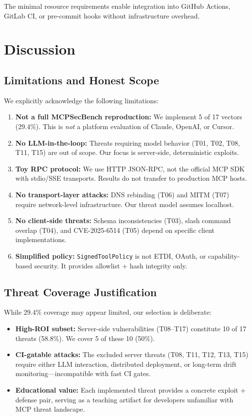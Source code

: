 \documentclass[11pt]{article}
\begin{document}
The minimal resource requirements enable integration into GitHub Actions, GitLab CI, or pre-commit hooks without infrastructure overhead.

\section{Discussion}
\label{sec:discussion}

\subsection{Limitations and Honest Scope}

We explicitly acknowledge the following limitations:

\begin{enumerate}
    \item \textbf{Not a full MCPSecBench reproduction:} We implement 5 of 17 vectors (29.4\%). This is \emph{not} a platform evaluation of Claude, OpenAI, or Cursor.
    \item \textbf{No LLM-in-the-loop:} Threats requiring model behavior (T01, T02, T08, T11, T15) are out of scope. Our focus is server-side, deterministic exploits.
    \item \textbf{Toy RPC protocol:} We use HTTP JSON-RPC, not the official MCP SDK with stdio/SSE transports. Results do not transfer to production MCP hosts.
    \item \textbf{No transport-layer attacks:} DNS rebinding (T06) and MITM (T07) require network-level infrastructure. Our threat model assumes localhost.
    \item \textbf{No client-side threats:} Schema inconsistencies (T03), slash command overlap (T04), and CVE-2025-6514 (T05) depend on specific client implementations.
    \item \textbf{Simplified policy:} \texttt{SignedToolPolicy} is not ETDI, OAuth, or capability-based security. It provides allowlist + hash integrity only.
\end{enumerate}

\subsection{Threat Coverage Justification}

While 29.4\% coverage may appear limited, our selection is deliberate:

\begin{itemize}
    \item \textbf{High-ROI subset:} Server-side vulnerabilities (T08--T17) constitute 10 of 17 threats (58.8\%). We cover 5 of these 10 (50\%).
    \item \textbf{CI-gatable attacks:} The excluded server threats (T08, T11, T12, T13, T15) require either LLM interaction, distributed deployment, or long-term drift monitoring—incompatible with fast CI gates.
    \item \textbf{Educational value:} Each implemented threat provides a concrete exploit + defense pair, serving as a teaching artifact for developers unfamiliar with MCP threat landscape.
\end{itemize}
\end{document}
